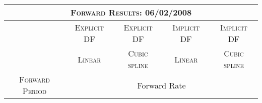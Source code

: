 
\begin{landscape}

\begin{table}[ht]
\begin{center}
\begin{tabular}{c|c|c|c|c}

\multicolumn{5}{c}{\textsc{Forward Results: 06/02/2008}} \\
\toprule
& \textsc{Explicit DF} & \textsc{Explicit DF} & \textsc{Implicit DF} & \textsc{Implicit DF} \\
 
 & \textsc{Linear} & \textsc{Cubic spline} & \textsc{Linear} & \textsc{Cubic spline}  \\

\toprule
\textsc{Forward Period} & \multicolumn{4}{c}{Forward Rate} \\



\end{tabular}
\end{center}
\end{table}
\end{landscape}
